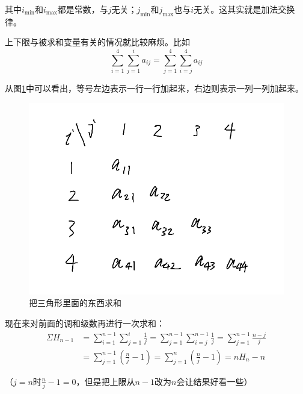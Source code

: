 其中$i_\text{min}$和$i_\text{max}$都是常数，与$j$无关；$j_\text{min}$和$j_\text{max}$也与$i$无关。这其实就是加法交换律。

上下限与被求和变量有关的情况就比较麻烦。比如
\begin{equation*}
\sum_{i=1}^4 \sum_{j=1}^i a_{i j}=\sum_{j=1}^4 \sum_{i=j}^4 a_{i j}
\end{equation*}

从图\ref{fig-triangle-sum}中可以看出，等号左边表示一行一行加起来，右边则表示一列一列加起来。
\begin{figure}[htb]
\centering
\includegraphics[scale=0.5]{fig/triangle-sum.png}
\caption{把三角形里面的东西求和}
\label{fig-triangle-sum}
\end{figure}

现在来对前面的调和级数再进行一次求和：
\begin{align*}
\Sigma H_{n-1}&=\sum_{i=1}^{n-1} \sum_{j=1}^i \frac{1}{j}=\sum_{j=1}^{n-1} \sum_{i=j}^{n-1} \frac{1}{j}=\sum_{j=1}^{n-1} \frac{n-j}{j} \\
&=\sum_{j=1}^{n-1} (\frac{n}{j}-1)=\sum_{j=1}^{n} (\frac{n}{j}-1)=n H_n-n
\end{align*}

（$j=n$时$\frac{n}{j}-1=0$，但是把上限从$n-1$改为$n$会让结果好看一些）

